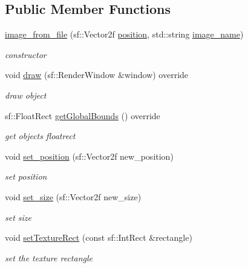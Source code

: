 \subsection*{Public Member Functions}
\begin{DoxyCompactItemize}
\item 
\hyperlink{classimage__from__file_a08fd7ad55a2eb520242e31ff3cdf2663}{image\+\_\+from\+\_\+file} (sf\+::\+Vector2f \hyperlink{classdrawable_a34679fa5ae82eee65dfd6b1b9f3c7cb6}{position}, std\+::string \hyperlink{classimage__from__file_a236ad235d4ef465070466a1c2f524a8e}{image\+\_\+name})
\begin{DoxyCompactList}\small\item\em constructor \end{DoxyCompactList}\item 
void \hyperlink{classimage__from__file_a26eae6c872ca9033cacc3f6eb2762983}{draw} (sf\+::\+Render\+Window \&window) override
\begin{DoxyCompactList}\small\item\em draw object \end{DoxyCompactList}\item 
sf\+::\+Float\+Rect \hyperlink{classimage__from__file_a971a591f906fa5c6e85b4e32cfc3d6a0}{get\+Global\+Bounds} () override
\begin{DoxyCompactList}\small\item\em get objects floatrect \end{DoxyCompactList}\item 
void \hyperlink{classimage__from__file_a868911f8d541af91290fb8dc56435cd2}{set\+\_\+position} (sf\+::\+Vector2f new\+\_\+position)
\begin{DoxyCompactList}\small\item\em set position \end{DoxyCompactList}\item 
void \hyperlink{classimage__from__file_a43b0d6b11bf46827308e4e6cb7aa8579}{set\+\_\+size} (sf\+::\+Vector2f new\+\_\+size)
\begin{DoxyCompactList}\small\item\em set size \end{DoxyCompactList}\item 
void \hyperlink{classimage__from__file_a6561a7e8833e4ca84ba5a31e98802757}{set\+Texture\+Rect} (const sf\+::\+Int\+Rect \&rectangle)
\begin{DoxyCompactList}\small\item\em set the texture rectangle \end{DoxyCompactList}\item 

\end{DoxyCompactItemize}
